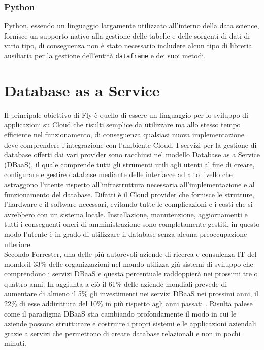 \subsubsection{Python}
Python, essendo un linguaggio largamente utilizzato all'interno della data science, fornisce un supporto nativo alla gestione delle tabelle e delle sorgenti di dati di vario tipo, di conseguenza non è stato necessario includere alcun tipo di libreria ausiliaria per la gestione dell'entità \verb|dataframe| e dei suoi metodi.

\section{Database as a Service}
Il principale obiettivo di Fly è quello di essere un linguaggio per lo sviluppo di applicazioni su Cloud che risulti semplice da utilizzare ma allo stesso tempo efficiente nel funzionamento, di conseguenza qualsiasi nuova implementazione deve comprendere l'integrazione con l'ambiente Cloud. I servizi per la gestione di database offerti dai vari provider sono racchiusi nel modello Database as a Service (DBaaS), il quale comprende tutti gli strumenti utili agli utenti al fine di creare, configurare e gestire database mediante delle interfacce ad alto livello che astraggono l'utente rispetto all'infrastruttura necessaria all'implementazione e al funzionamento del database. Difatti è il Cloud provider che fornisce le strutture, l’hardware e il software necessari, evitando tutte le complicazioni e i costi che si avrebbero con un sistema locale. Installazione, manutenzione, aggiornamenti e tutti i conseguenti oneri di amministrazione sono completamente gestiti, in questo modo l'utente è in grado di utilizzare il database senza alcuna preoccupazione ulteriore.\\
Secondo Forrester, una delle più autorevoli aziende di ricerca e consulenza IT del mondo,il 33\% delle organizzazioni nel mondo utilizza già sistemi di sviluppo che comprendono i servizi DBaaS e questa percentuale raddoppierà nei prossimi tre o quattro anni. In aggiunta a ciò il 61\% delle aziende mondiali prevede di aumentare di almeno il 5\% gli investimenti nei servizi DBaaS nei prossimi anni, il 22\% di esse addirittura del 10\% in più rispetto agli anni passati \cite{forrester}. Risulta palese come il paradigma DBaaS stia cambiando profondamente il modo in cui le aziende possono strutturare e costruire i propri sistemi e le applicazioni aziendali grazie a servizi che permettono di creare database relazionali e non in pochi minuti.\\
